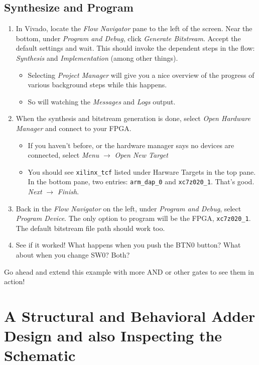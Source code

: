 \documentclass[11pt]{article}
\begin{document}
\subsection{Synthesize and Program}
\begin{enumerate}
  \item In Vivado, locate the \emph{Flow Navigator} pane to the left of the screen. Near the bottom, under \emph{Program and Debug}, click \emph{Generate Bitstream}. Accept the default settings and wait. This should invoke the dependent steps in the flow: \emph{Synthesis} and \emph{Implementation} (among other things).
    \begin{itemize}
      \item Selecting \emph{Project Manager} will give you a nice overview of the progress of various background steps while this happens.
      \item So will watching the \emph{Messages} and \emph{Logs} output.
    \end{itemize}
  \item When the synthesis and bitstream generation is done, select \emph{Open Hardware Manager} and connect to your FPGA.
    \begin{itemize}
      \item If you haven't before, or the hardware manager says no devices are connected, select \emph{Menu} $\rightarrow$ \emph{Open New Target}
      \item You should see \verb|xilinx_tcf| listed under Harware Targets in the top pane. In the bottom pane, two entries: \verb|arm_dap_0| and \verb|xc7z020_1|. That's good. \emph{Next} $\rightarrow$ \emph{Finish}.
    \end{itemize}
  \item Back in the \emph{Flow Navigator} on the left, under \emph{Program and Debug}, select \emph{Program Device}. The only option to program will be the FPGA, \verb|xc7z020_1|. The default bitstream file path should work too.
  \item See if it worked! What happens when you push the BTN0 button? What about when you change SW0? Both?
\end{enumerate}

Go ahead and extend this example with more AND or other gates to see them in action!

\section{A Structural and Behavioral Adder Design and also Inspecting the Schematic}
\end{document}
